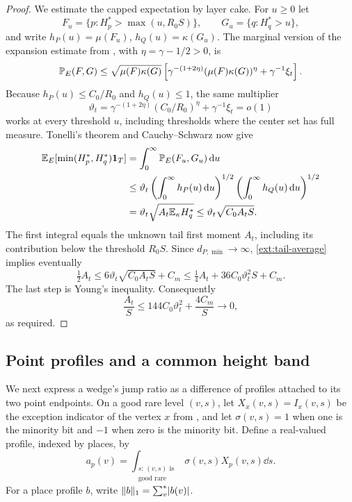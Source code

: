 \begin{proof}
We estimate the capped expectation by layer cake.  For \(u\ge0\) let
\[
 F_u=\{p:H_p^*>\max(u,R_0S)\},\qquad
 G_u=\{q:H_q^*>u\},
\]
and write \(h_P(u)=\mu(F_u)\), \(h_Q(u)=\kappa(G_u)\).
The marginal version of the expansion estimate from ,
with \(\eta=\gamma-1/2>0\), is
\[
 \mathbb P_E(F,G)\le\sqrt{\mu(F)\kappa(G)}
 \left[\gamma^{-(1+2\eta)}(\mu(F)\kappa(G))^\eta
                         +\gamma^{-1}\xi_t\right].
\]
Because \(h_P(u)\le C_0/R_0\) and \(h_Q(u)\le1\), the same multiplier
\[
 \vartheta_t=\gamma^{-(1+2\eta)}(C_0/R_0)^\eta
                      +\gamma^{-1}\xi_t=o(1)
\]
works at every threshold \(u\), including thresholds where the center set
has full measure.  Tonelli's theorem and Cauchy--Schwarz now give
\begin{align*}
 \mathbb E_E[\min(H_p^*,H_q^*)\mathbf1_T]
 &=\int_0^\infty\mathbb P_E(F_u,G_u)\,\mathrm d u\\
 &\le\vartheta_t
       \left(\int_0^\infty h_P(u)\,\mathrm d u\right)^{1/2}
       \left(\int_0^\infty h_Q(u)\,\mathrm d u\right)^{1/2}\\
 &=\vartheta_t\sqrt{A_t\mathbb E_\kappa H_q^*}
 \le\vartheta_t\sqrt{C_0A_tS}.
\end{align*}
The first integral equals the unknown tail first moment \(A_t\), including
its contribution below the threshold \(R_0S\).
Since \(d_{P,\min}\to\infty\), \eqref{ext:tail-average} implies eventually
\[
 \tfrac12 A_t\le6\vartheta_t\sqrt{C_0A_tS}+C_m
       \le\tfrac14 A_t+36C_0\vartheta_t^2S+C_m.
\]
The last step is Young's inequality.  Consequently
\[
 \frac{A_t}{S}\le144C_0\vartheta_t^2+\frac{4C_m}{S}\longrightarrow0,
\]
as required.
\end{proof}

\subsection{Point profiles and a common height band}

We next express a wedge's jump ratio as a difference of profiles attached
to its two point endpoints.  On a good rare level \((v,s)\), let
\(X_x(v,s)=I_x(v,s)\) be the exception indicator of the vertex \(x\)
from , and let
\(\sigma(v,s)=1\) when one is the minority bit and \(-1\) when zero is
the minority bit.  Define a real-valued profile, indexed by places, by
\begin{equation}\label{ext:profile-definition}
 a_p(v)=\int_{\substack{s:\,(v,s)\text{ is}\\\text{good rare}}}
                       \sigma(v,s)X_p(v,s)\dd s.
\end{equation}
For a place profile \(b\), write \(\lVert b\rVert_1=\sum_v^*\lvert b(v)\rvert\).

